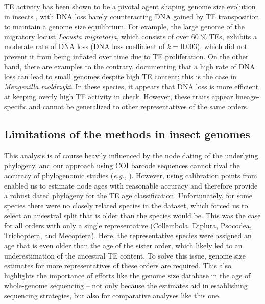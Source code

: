 TE activity has been shown to be a pivotal agent shaping genome size
evolution in insects \citep{Maumus2015}, with DNA loss barely
counteracting DNA gained by TE transposition to maintain a genome size
equilibrium. For example, the large genome of the migratory locust
\emph{Locusta migratoria}, which consists of over 60 \% TEs, exhibits a
moderate rate of DNA loss (DNA loss coefficient of \emph{k} = 0.003),
which did not prevent it from being inflated over time due to TE
proliferation. On the other hand, there are examples to the contrary,
documenting that a high rate of DNA loss can lead to small genomes
despite high TE content; this is the case in \emph{Mengenilla
moldrzyki}. In these species, it appears that DNA loss is more efficient
at keeping overly high TE activity in check. However, these traits
appear lineage-specific and cannot be generalized to other
representatives of the same orders.

\subsection*{Limitations of the methods in insect
genomes}\label{limitations-of-the-methods-in-insect-genomes}

This analysis is of course heavily influenced by the node dating of the
underlying phylogeny, and our approach using COI barcode sequences
cannot rival the accuracy of phylogenomic studies (\emph{e.g.},
\citep{Misof2014}). However, using calibration points from
\citep{Misof2014} enabled us to estimate node ages with reasonable
accuracy and therefore provide a robust dated phylogeny for the TE age
classification. Unfortunately, for some species there were no closely
related species in the dataset, which forced us to select an ancestral
split that is older than the species would be. This was the case for all
orders with only a single representative (Collembola, Diplura, Psocodea,
Trichoptera, and Mecoptera). Here, the representative species were
assigned an age that is even older than the age of the sister order,
which likely led to an underestimation of the ancestral TE content. To
solve this issue, genome size estimates for more representatives of
these orders are required. This also highlights the importance of
efforts like the genome size database \citep{Gregory2018} in the age of
whole-genome sequencing -- not only because the estimates aid in
establishing sequencing strategies, but also for comparative analyses
like this one.

